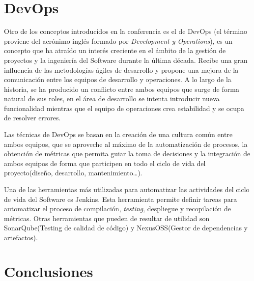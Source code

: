 \section{DevOps}

Otro de los conceptos introducidos en la conferencia es el de DevOps (el término proviene del acrónimo inglés formado por \textit{Development y Operations}), es un concepto que ha atraído un interés creciente en el ámbito de la gestión de proyectos y la ingeniería del Software durante la última década. Recibe una gran influencia de las metodologías ágiles de desarrollo y propone una mejora de la comunicación entre los equipos de desarrollo y operaciones. A lo largo de la historia, se ha producido un conflicto entre ambos equipos que surge de forma natural de sus roles, en el área de desarrollo se intenta introducir nueva funcionalidad mientras que el equipo de operaciones crea estabilidad y se ocupa de resolver errores. 

Las técnicas de DevOps se basan en la creación de una cultura común entre ambos equipos, que se aproveche al máximo de la automatización de procesos, la obtención de métricas que permita guiar la toma de decisiones y la integración de ambos equipos de forma que participen en todo el ciclo de vida del proyecto(diseño, desarrollo, mantenimiento…).

Una de las herramientas más utilizadas para automatizar las actividades del ciclo de vida del Software es Jenkins. Esta herramienta permite definir tareas para automatizar el proceso de compilación, \textit{testing}, despliegue y recopilación de métricas. Otras herramientas que pueden de resultar de utilidad son SonarQube(Testing de calidad de código) y NexusOSS(Gestor de dependencias y artefactos).


\section{Conclusiones}\label{sec:conclu}


